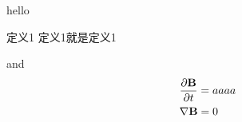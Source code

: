 
hello
\begin{definition}{定义1}
定义1就是定义1
\end{definition}
and
$$
\begin{align}
&{\partial \textbf{B}\over \partial t}=aaaa\\
&\nabla \textbf{B}=0
\end{align}
$$
